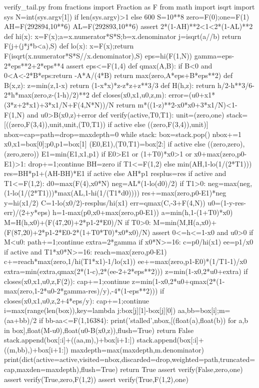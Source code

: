 \begin{filecontents*}[overwrite]{verify_tail.py}
from fractions import Fraction as F
from math import isqrt
import sys
N=int(sys.argv[1]) if len(sys.argv)>1 else 600
S=10**8
zero=F(0);one=F(1)
AH=F(292894,10**6)
AL=F(292893,10**6)
assert 2*(1-AH)**2<1<2*(1-AL)**2
def hi(x):
 x=F(x);a=x.numerator*S*S;b=x.denominator
 j=isqrt(a//b)
 return F(j+(j*j*b<a),S)
def lo(x):
 x=F(x);return F(isqrt(x.numerator*S*S//x.denominator),S)
eps=hi(F(1,N))
gamma=eps-2*eps**2+2*eps**4
assert eps<=F(1,4)
def qmax(A,B):
 if B<0 and 0<A<-2*B*eps:return -A*A/(4*B)
 return max(zero,A*eps+B*eps**2)
def B(x,z):
 z=min(z,1-x)
 return (1-x*x)*z-z*z+z**3/3
def H(h,z):
 return h/2-h**3/6-2*h*max(zero,z-(1-h)/2)**2
def closes(x0,x1,u0,z,m):
 error=(u0+x1*(3*z+2*x1)+3*x1/N+F(4,N*N))/N
 return m*((1-z)**2-x0*x0+3*x1/N)<1-F(1,N) and u0>B(x0,z)+error
def verify(active,T0,T1):
 unit=(zero,one)
 stack=[((zero,F(3,4)),unit,unit,(T0,T1)) if active else ((zero,F(3,4)),unit)]
 nbox=cap=path=drop=maxdepth=0
 while stack:
  box=stack.pop()
  nbox+=1
  x0,x1=box[0];p0,p1=box[1]
  (E0,E1),(T0,T1)=box[2:] if active else ((zero,zero),(zero,zero))
  E1=min(E1,x1,p1)
  if E0>E1 or (1+T0)*x0>1 or x0+max(zero,p0-E1)>1:
   drop+=1;continue
  BH=zero if T1<=F(1,2) else min(AH,1-lo(1/(2*T1)))
  res=BH*p1+(AH-BH)*E1 if active else AH*p1
  resplus=res
  if active and T1<=F(1,2):
   d0=max(F(4),x0*N)
   neg=AL*(1-lo(d0)/2)
   if T1>0:
    neg=max(neg,(1-lo(1/(2*T1)))*max(AL,1-hi(1/(T1*d0))))
   res+=max(zero,p0-E1)*neg
  y=hi(x1/2)
  C=1-lo(x0/2)-resplus/hi(x1)
  err=qmax(C,-3+F(4,N))
  u0=(1-y-res-err)/(2+y*eps)
  h=1-max(p0,x0+max(zero,p0-E1))
  a=min(h,1-(1+T0)*x0)
  M=H(h,x0)+(F(47,20)+2*p1-2*E0)/N
  if T0>0:
   M=min(M,H(a,x0)+(F(87,20)+2*p1-2*E0-2*(1+T0*T0)*x0*x0)/N)
  assert 0<=h<=1-x0 and u0>0
  if M<u0:
   path+=1;continue
  extra=2*gamma
  if x0*N>=16:
   c=p0/hi(x1)
   ee=p1/x0
   if active and T1*x0*N>=16:
    reach=max(zero,p0-E1)
    c+=reach*max(zero,1/hi(T1*x1)-1/lo(x1))
    ee+=max(zero,p1-E0)*(1/T1-1)/x0
   extra=min(extra,qmax(2*(1-c),2*(ee-2+2*eps**2)))
  z=min(1-x0,2*u0+extra)
  if closes(x0,x1,u0,z,F(2)):
   cap+=1;continue
  z=min(1-x0,2*u0+qmax(2*(1-max(zero,1-2*u0-2*gamma-res)/y),-4*(1-eps**2)))
  if closes(x0,x1,u0,z,2+4*eps/y):
   cap+=1;continue
  i=max(range(len(box)),key=lambda j:box[j][1]-box[j][0])
  aa,bb=box[i];m=(aa+bb)/2
  if bb-aa<=F(1,16384):
   print('stalled',nbox,[(float(a),float(b)) for a,b in box],float(M-u0),float(u0-B(x0,z)),flush=True)
   return False
  stack.append(box[:i]+((aa,m),)+box[i+1:])
  stack.append(box[:i]+((m,bb),)+box[i+1:])
  maxdepth=max(maxdepth,m.denominator)
 print(dict(active=active,visited=nbox,discarded=drop,weighted=path,truncated=cap,maxden=maxdepth),flush=True)
 return True
assert verify(False,zero,one)
assert verify(True,zero,F(1,2))
assert verify(True,F(1,2),one)
\end{filecontents*}
